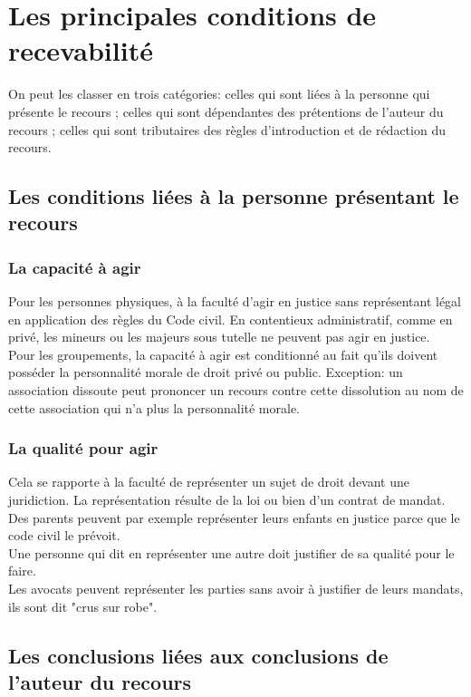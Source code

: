 \documentclass[10pt, a4paper, openany]{book}
\begin{document}
\section{Les principales conditions de recevabilité}

On peut les classer en trois catégories: celles qui sont liées à la personne qui présente le recours ; celles qui sont dépendantes des prétentions de l'auteur du recours ; celles qui sont tributaires des règles d'introduction et de rédaction du recours. 

\subsection{Les conditions liées à la personne présentant le recours}

\subsubsection{La capacité à agir}

Pour les personnes physiques, à la faculté d'agir en justice sans représentant légal en application des règles du Code civil. En contentieux administratif, comme en privé, les mineurs ou les majeurs sous tutelle ne peuvent pas agir en justice. \\
Pour les groupements, la capacité à agir est conditionné au fait qu'ils doivent posséder la personnalité morale de droit privé ou public. Exception: un association dissoute peut prononcer un recours contre cette dissolution au nom de cette association qui n'a plus la personnalité morale.

\subsubsection{La qualité pour agir}

Cela se rapporte à la faculté de représenter un sujet de droit devant une juridiction. La représentation résulte de la loi ou bien d'un contrat de mandat. Des parents peuvent par exemple représenter leurs enfants en justice parce que le code civil le prévoit. \\
Une personne qui dit en représenter une autre doit justifier de sa qualité pour le faire. \\
Les avocats peuvent représenter les parties sans avoir à justifier de leurs mandats, ils sont dit "crus sur robe". 

\subsection{Les conclusions liées aux conclusions de l'auteur du recours}
\end{document}
